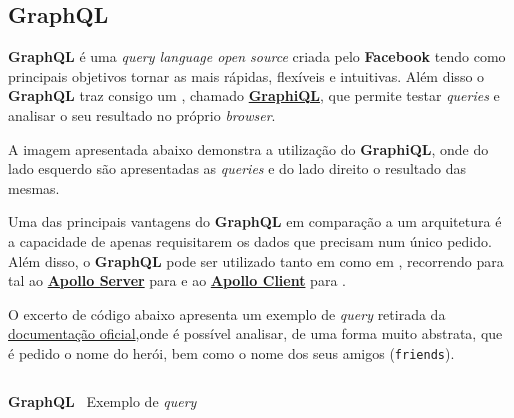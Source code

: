 \subsection{GraphQL}

\begin{minipage}[t]{.3\textwidth}
\end{minipage}
\begin{minipage}[t]{.7\textwidth}
	\minipagerestore
	\textbf{GraphQL} é uma \textit{query language open source} criada pelo \textbf{Facebook} tendo como principais objetivos tornar as  mais rápidas, flexíveis e intuitivas. Além disso o \textbf{GraphQL} traz consigo um , chamado \textbf{\href{https://github.com/graphql/graphiql}{GraphiQL}}, que permite testar \textit{queries} e analisar o seu resultado no próprio \textit{browser}.

	A imagem apresentada abaixo demonstra a utilização do \textbf{GraphiQL}, onde do lado esquerdo são apresentadas as \textit{queries} e do lado direito o resultado das mesmas.
\end{minipage}


Uma das principais vantagens do \textbf{GraphQL} em comparação a um arquitetura  é a capacidade de apenas requisitarem os dados que precisam num único pedido. Além disso, o \textbf{GraphQL} pode ser utilizado tanto em  como em , recorrendo para tal ao \href{https://www.apollographql.com/docs/apollo-server/}{\textbf{Apollo Server}} para  e ao \textbf{\href{https://www.apollographql.com/docs/react/}{Apollo Client}} para .

O excerto de código abaixo apresenta um exemplo de \textit{query} retirada da \href{https://graphql.org/learn/queries/}{documentação oficial},onde é possível analisar, de uma forma muito abstrata, que é pedido o nome do herói, bem como o nome dos seus amigos (\texttt{friends}).

\begin{longlisting}
	\inputminted{text}{code/graphql/example-query.graphql}
	\caption{\textbf{GraphQL} \textemdash~Exemplo de \textit{query}}
\end{longlisting}

